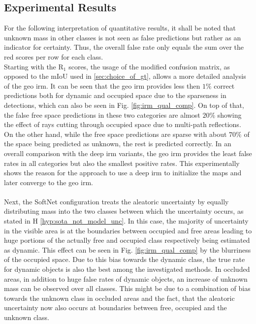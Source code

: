 \subsection{Experimental Results}
\label{subsec:exp_results_aleat_uncert}
For the following interpretation of quantitative results, it shall be noted that unknown mass in other classes is not seen as false predictions but rather as an indicator for certainty. Thus, the overall false rate only equals the sum over the red scores per row for each class.
\\ 
Starting with the R$_1$ scores, the usage of the modified confusion matrix, as opposed to the mIoU used in \ref{sec:choice_of_gt}, allows a more detailed analysis of the geo \gls{irm}. It can be seen that the geo \gls{irm} provides less then $1\%$ correct predictions both for dynamic and occupied space due to the sparseness in detections, which can also be seen in Fig. \ref{fig:irm_qual_comp}. On top of that, the false free space predictions in these two categories are almost $20\%$ showing the effect of rays cutting through occupied space due to multi-path reflections. On the other hand, while the free space predictions are sparse with about $70\%$ of the space being predicted as unknown, the rest is predicted correctly. In an overall comparison with the deep \gls{irm} variants, the geo \gls{irm} provides the least false rates in all categories but also the smallest positive rates. This experimentally shows the reason for the approach to use a deep \gls{irm} to initialize the maps and later converge to the geo \gls{irm}.
\\\\
Next, the SoftNet configuration treats the aleatoric uncertainty by equally distributing mass into the two classes between which the uncertainty occurs, as stated in H \ref{hyp:sota_not_model_unc}. In this case, the majority of uncertainty in the visible area is at the boundaries between occupied and free areas leading to huge portions of the actually free and occupied class respectively being estimated as dynamic. This effect can be seen in Fig. \ref{fig:irm_qual_comp} by the blurriness of the occupied space. Due to this bias towards the dynamic class, the true rate for dynamic objects is also the best among the investigated methods. In occluded areas, in addition to huge false rates of dynamic objects, an increase of unknown mass can be observed over all classes. This might be due to a combination of bias towards the unknown class in occluded areas and the fact, that the aleatoric uncertainty now also occurs at boundaries between free, occupied and the unknown class. 
